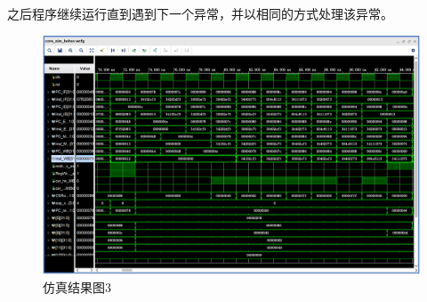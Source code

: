 之后程序继续运行直到遇到下一个异常，并以相同的方式处理该异常。
\begin{figure}[H] %
	\centering %
	\includegraphics[width=1.0\textwidth]{figs/3.png} %
	\caption{仿真结果图3} %
	\label{Fig.13} %
\end{figure}
